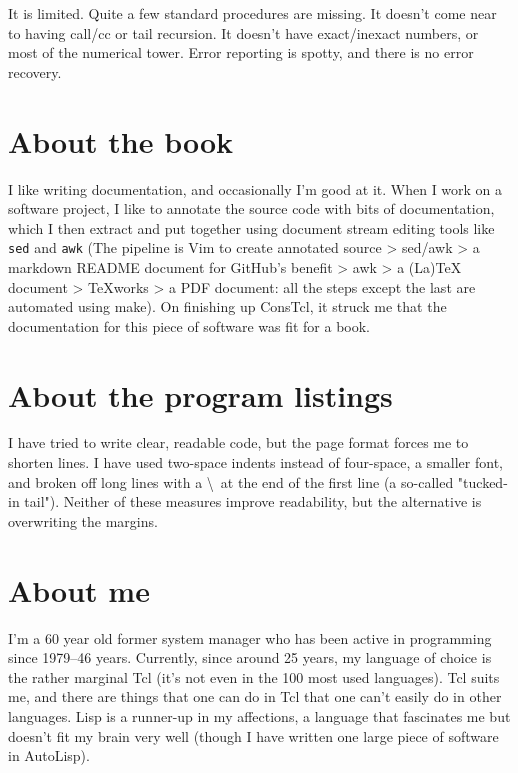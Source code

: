 \documentclass[twoside,9pt]{report}
\begin{document}
It is limited. Quite a few standard procedures are missing. It doesn't come near to having call/cc or tail recursion. It doesn't have exact/inexact numbers, or most of the numerical tower. Error reporting is spotty, and there is no error recovery.

\section{About the book}
\label{about-the-book}

I like writing documentation, and occasionally I'm good at it. When I work on a software project, I like to annotate the source code with bits of documentation, which I then extract and put together using document stream editing tools like \texttt{sed} and \texttt{awk} (The pipeline is Vim to create annotated source > sed/awk > a markdown README document for GitHub's benefit > awk > a (La)TeX document > TeXworks > a PDF document: all the steps except the last are automated using make). On finishing up ConsTcl, it struck me that the documentation for this piece of software was fit for a book.

\section{About the program listings}
\label{about-the-program-listings}

I have tried to write clear, readable code, but the page format forces me to shorten lines. I have used two-space indents instead of four-space, a smaller font, and broken off long lines with a \textbackslash\  at the end of the first line (a so-called "tucked-in tail"). Neither of these measures improve readability, but the alternative is overwriting the margins.

\section{About me}
\label{about-me}

I'm a 60 year old former system manager who has been active in programming since 1979--46 years. Currently, since around 25 years, my language of choice is the rather marginal Tcl (it's not even in the 100 most used languages). Tcl suits me, and there are things that one can do in Tcl that one can't easily do in other languages. Lisp is a runner-up in my affections, a language that fascinates me but doesn't fit my brain very well (though I have written one large piece of software in AutoLisp).
\end{document}
